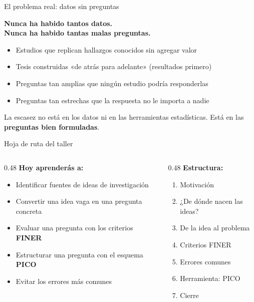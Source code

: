 \documentclass[12pt, aspectratio=169]{beamer}
\begin{document}
\begin{frame}{El problema real: datos sin preguntas}
  \begin{center}
    \Large\textbf{Nunca ha habido tantos datos.\\[4pt]
    Nunca ha habido tantas malas preguntas.}
  \end{center}

  \medskip
  \begin{itemize}
    \item Estudios que replican hallazgos conocidos sin agregar valor
    \item Tesis construidas «de atrás para adelante» (resultados primero)
    \item Preguntas tan amplias que ningún estudio podría responderlas
    \item Preguntas tan estrechas que la respuesta no le importa a nadie
  \end{itemize}

  \medskip
  \begin{warningbox}
    \small La escasez no está en los datos ni en las herramientas
    estadísticas. Está en las \textbf{preguntas bien formuladas}.
  \end{warningbox}
\end{frame}

\begin{frame}{Hoja de ruta del taller}
  \begin{columns}[T]
    \begin{column}{0.48\textwidth}
      \textbf{Hoy aprenderás a:}
      \begin{itemize}
        \item Identificar fuentes de ideas de investigación
        \item Convertir una idea vaga en una pregunta concreta
        \item Evaluar una pregunta con los criterios \textbf{FINER}
        \item Estructurar una pregunta con el esquema \textbf{PICO}
        \item Evitar los errores más comunes
      \end{itemize}
    \end{column}
    \begin{column}{0.48\textwidth}
      \textbf{Estructura:}
      \begin{enumerate}
        \small
        \item[\textbf{B}] Motivación
        \item[\textbf{C}] ¿De dónde nacen las ideas?
        \item[\textbf{D}] De la idea al problema
        \item[\textbf{E}] Criterios FINER
        \item[\textbf{F}] Errores comunes
        \item[\textbf{G}] Herramienta: PICO
        \item[\textbf{H}] Cierre
      \end{enumerate}
    \end{column}
  \end{columns}
\end{frame}
\end{document}
